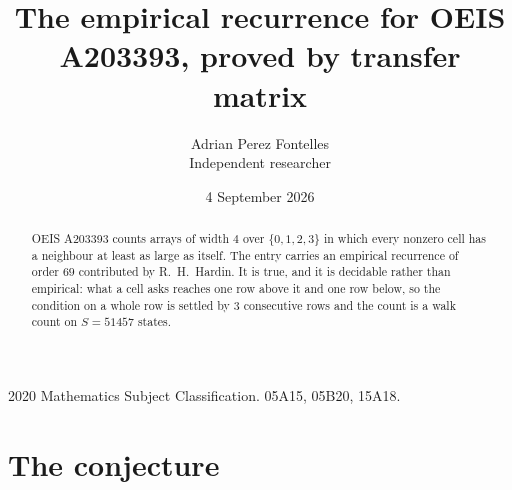 \documentclass[11pt,a4paper]{article}
\title{The empirical recurrence for OEIS A203393, proved by transfer matrix}
\author{Adrian Perez Fontelles\\ \small Independent researcher}
\date{4 September 2026}
\theoremstyle{plain}
\theoremstyle{definition}
\begin{document}
\maketitle

\begin{abstract}
OEIS A203393 counts arrays of width $4$ over $\{0,1,2,3\}$ in which every nonzero cell has a neighbour at least as large as itself. The entry carries an
empirical recurrence of order $69$ contributed by R.~H.~Hardin. It is true, and it is
decidable rather than empirical: what a cell asks reaches one row above it and one row below, so the
condition on a whole row is settled by $3$ consecutive rows and the count is a walk
count on $S=51457$ states.
\end{abstract}

\noindent\small 2020 Mathematics Subject Classification. 05A15, 05B20, 15A18.\normalsize

\section{The conjecture}
\end{document}
